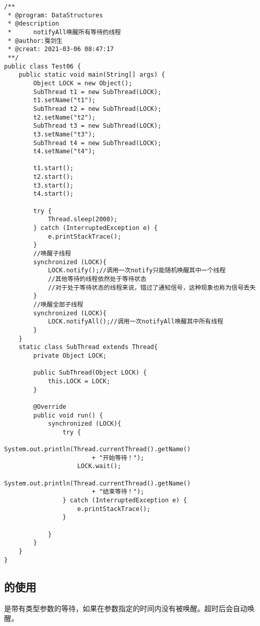 \documentclass[a4paper]{report}
\begin{document}
\begin{Verbatim}[frame=single,numbersep=5pt,xleftmargin=1.5em,xrightmargin=1.5em]
/**
 * @program: DataStructures
 * @description
 *      notifyAll唤醒所有等待的线程
 * @author:戛剑生
 * @creat: 2021-03-06 08:47:17
 **/
public class Test06 {
    public static void main(String[] args) {
        Object LOCK = new Object();
        SubThread t1 = new SubThread(LOCK);
        t1.setName("t1");
        SubThread t2 = new SubThread(LOCK);
        t2.setName("t2");
        SubThread t3 = new SubThread(LOCK);
        t3.setName("t3");
        SubThread t4 = new SubThread(LOCK);
        t4.setName("t4");

        t1.start();
        t2.start();
        t3.start();
        t4.start();

        try {
            Thread.sleep(2000);
        } catch (InterruptedException e) {
            e.printStackTrace();
        }
        //唤醒子线程
        synchronized (LOCK){
            LOCK.notify();//调用一次notify只能随机唤醒其中一个线程
            //其他等待的线程依然处于等待状态
            //对于处于等待状态的线程来说，错过了通知信号，这种现象也称为信号丢失
        }
        //唤醒全部子线程
        synchronized (LOCK){
            LOCK.notifyAll();//调用一次notifyAll唤醒其中所有线程
        }
    }
    static class SubThread extends Thread{
        private Object LOCK;

        public SubThread(Object LOCK) {
            this.LOCK = LOCK;
        }

        @Override
        public void run() {
            synchronized (LOCK){
                try {
                    System.out.println(Thread.currentThread().getName() 
                        + "开始等待！");
                    LOCK.wait();
                    System.out.println(Thread.currentThread().getName() 
                        + "结束等待！");
                } catch (InterruptedException e) {
                    e.printStackTrace();
                }

            }
        }
    }
}\end{Verbatim}
\subsection{的使用}
是带有类型参数的等待，如果在参数指定的时间内没有被唤醒。超时后会自动唤醒。
\end{document}
